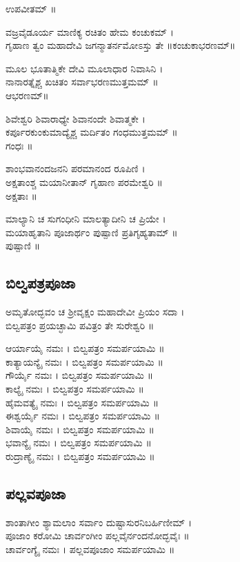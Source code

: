  ಉಪವೀತಮ್ ॥

ವಜ್ರವೈಡೂರ್ಯ ಮಾಣಿಕ್ಯ ರಚಿತಂ ಹೇಮ ಕಂಚುಕಮ್ ।\\
ಗೃಹಾಣ ತ್ವಂ ಮಹಾದೇವಿ ಜಗನ್ಮಾತರ್ನಮೋಽಸ್ತು ತೇ ॥ಕಂಚುಕಾಭರಣಮ್॥

ಮೂಲ ಭೂತಾತ್ಮಿಕೇ ದೇವಿ ಮೂಲಾಧಾರ ನಿವಾಸಿನಿ ।\\
ನಾನಾರತ್ನೈಶ್ಚ ಖಚಿತಂ ಸರ್ವಾಭರಣಮುತ್ತಮಮ್ ॥\\
ಆಭರಣಮ್॥

ಶಿವೇಶ್ವರಿ ಶಿವಾರಾಧ್ಯೇ ಶಿವಾನಂದೇ ಶಿವಾತ್ಮಕೇ ।\\
ಕರ್ಪೂರಕುಂಕುಮಾದ್ಯೈಶ್ಚ ಮರ್ದಿತಂ ಗಂಧಮುತ್ತಮಮ್ ॥\\
ಗಂಧಃ ॥

ಶಾಂಭವಾನಂದಜನನಿ ಪರಮಾನಂದ ರೂಪಿಣಿ ।\\
ಅಕ್ಷತಾಂಶ್ಚ ಮಯಾನೀತಾನ್ ಗೃಹಾಣ ಪರಮೇಶ್ವರಿ ॥\\
ಅಕ್ಷತಾಃ ॥

ಮಾಲ್ಯಾನಿ ಚ ಸುಗಂಧೀನಿ ಮಾಲತ್ಯಾದೀನಿ ಚ ಪ್ರಿಯೇ ।\\
ಮಯಾಹೃತಾನಿ ಪೂಜಾರ್ಥಂ ಪುಷ್ಪಾಣಿ ಪ್ರತಿಗೃಹ್ಯತಾಮ್ ॥\\
ಪುಷ್ಪಾಣಿ ॥
\subsection{ಬಿಲ್ವಪತ್ರಪೂಜಾ}
ಅಮೃತೋದ್ಭವಂ ಚ ಶ್ರೀವೃಕ್ಷಂ ಮಹಾದೇವೀ ಪ್ರಿಯಂ ಸದಾ ।\\
ಬಿಲ್ವಪತ್ರಂ ಪ್ರಯಚ್ಛಾಮಿ ಪವಿತ್ರಂ ತೇ ಸುರೇಶ್ವರಿ ॥

ಆರ್ಯಾಯೈ ನಮಃ । ಬಿಲ್ವಪತ್ರಂ ಸಮರ್ಪಯಾಮಿ ॥\\
ಕಾತ್ಯಾಯನ್ಯೈ ನಮಃ । ಬಿಲ್ವಪತ್ರಂ ಸಮರ್ಪಯಾಮಿ ॥\\
ಗೌರ್ಯೈ ನಮಃ । ಬಿಲ್ವಪತ್ರಂ ಸಮರ್ಪಯಾಮಿ ॥\\
ಕಾಲ್ಯೈ ನಮಃ । ಬಿಲ್ವಪತ್ರಂ ಸಮರ್ಪಯಾಮಿ ॥\\
ಹೈಮವತ್ಯೈ ನಮಃ । ಬಿಲ್ವಪತ್ರಂ ಸಮರ್ಪಯಾಮಿ ॥\\
ಈಶ್ವರ್ಯೈ ನಮಃ । ಬಿಲ್ವಪತ್ರಂ ಸಮರ್ಪಯಾಮಿ ॥\\
ಶಿವಾಯೈ ನಮಃ । ಬಿಲ್ವಪತ್ರಂ ಸಮರ್ಪಯಾಮಿ ॥\\
ಭವಾನ್ಯೈ ನಮಃ । ಬಿಲ್ವಪತ್ರಂ ಸಮರ್ಪಯಾಮಿ ॥\\
ರುದ್ರಾಣ್ಯೈ  ನಮಃ । ಬಿಲ್ವಪತ್ರಂ ಸಮರ್ಪಯಾಮಿ ॥
\subsection{ಪಲ್ಲವಪೂಜಾ}
ಶಾಂತಾಗೀಂ ಶ್ಯಾಮಲಾಂ ಸರ್ವಾಂ ದುಷ್ಟಾಸುರನಿಬರ್ಹಿಣೀಮ್ ।\\
ಪೂಜಾಂ ಕರೋಮಿ ಚಾರ್ವಂಗೀಂ ಪಲ್ಲವೈರ್ನಂದನೋದ್ಭವೈಃ ॥\\
ಚಾರ್ವಂಗ್ಯೈ ನಮಃ । ಪಲ್ಲವಪೂಜಾಂ ಸಮರ್ಪಯಾಮಿ ॥

